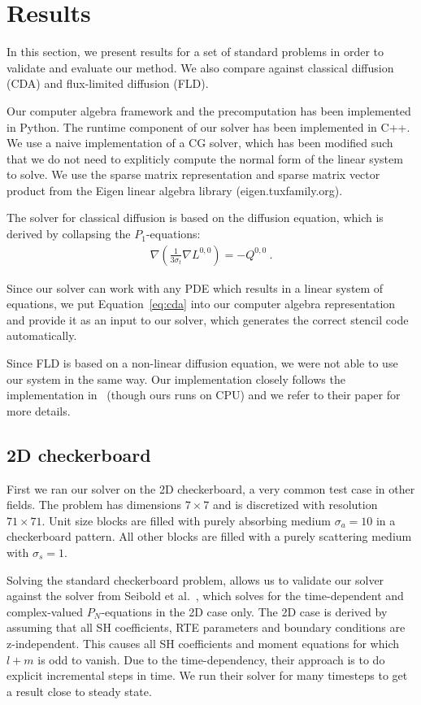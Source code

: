 \section{Results}
\label{sec:results}

In this section, we present results for a set of standard problems in order to validate and evaluate our method. We also compare against classical diffusion (CDA) and flux-limited diffusion (FLD).

Our computer algebra framework and the precomputation has been implemented in Python. The runtime component of our solver has been implemented in C++. We use a naive implementation of a CG solver, which has been modified such that we do not need to expliticly compute the normal form of the linear system to solve. We use the sparse matrix representation and sparse matrix vector product from the Eigen linear algebra library (eigen.tuxfamily.org).

The solver for classical diffusion is based on the diffusion equation, which is derived by collapsing the $P_1$-equations:
\begin{align} 
\nabla\left(\frac{1}{3\sigma_t}\nabla L^{0,0}\right)  = -Q^{0,0}
\ .
\label{eq:cda}
\end{align}

Since our solver can work with any PDE which results in a linear system of equations, we put Equation~\ref{eq:cda} into our computer algebra representation and provide it as an input to our solver, which generates the correct stencil code automatically.

Since FLD is based on a non-linear diffusion equation, we were not able to use our system in the same way. Our implementation closely follows the implementation in~\cite{Koerner14} (though ours runs on CPU) and we refer to their paper for more details.

\subsection{2D checkerboard}

First we ran our solver on the 2D checkerboard, a very common test case in other fields. The problem has dimensions $7\times 7$ and is discretized with resolution $71\times 71$. Unit size blocks are filled with purely absorbing medium $\sigma_a=10$ in a checkerboard pattern. All other blocks are filled with a purely scattering medium with $\sigma_s=1$.

Solving the standard checkerboard problem, allows us to validate our solver against the solver from Seibold et al.~\cite{Seibold14}, which solves for the time-dependent and complex-valued $P_N$-equations in the 2D case only. The 2D case is derived by assuming that all SH coefficients, RTE parameters and boundary conditions are z-independent. This causes all SH coefficients and moment equations for which $l+m$ is odd to vanish. Due to the time-dependency, their approach is to do explicit incremental steps in time. We run their solver for many timesteps to get a result close to steady state.

